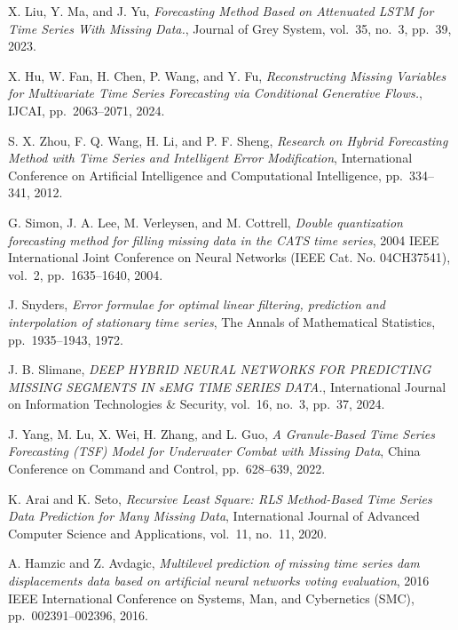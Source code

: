 \begin{enumerate}[label={[S\arabic*]}]
    \item %
    X. Liu, Y. Ma, and J. Yu, \textit{Forecasting Method Based on Attenuated LSTM for Time Series With Missing Data.}, Journal of Grey System, vol.~35, no.~3, pp.~39, 2023.
    \item %
    X. Hu, W. Fan, H. Chen, P. Wang, and Y. Fu, \textit{Reconstructing Missing Variables for Multivariate Time Series Forecasting via Conditional Generative Flows.}, IJCAI, pp.~2063–2071, 2024.
    \item %
    S. X. Zhou, F. Q. Wang, H. Li, and P. F. Sheng, \textit{Research on Hybrid Forecasting Method with Time Series and Intelligent Error Modification}, International Conference on Artificial Intelligence and Computational Intelligence, pp.~334–341, 2012.
    \item %
    G. Simon, J. A. Lee, M. Verleysen, and M. Cottrell, \textit{Double quantization forecasting method for filling missing data in the CATS time series}, 2004 IEEE International Joint Conference on Neural Networks (IEEE Cat. No. 04CH37541), vol.~2, pp.~1635–1640, 2004.
    \item %
    J. Snyders, \textit{Error formulae for optimal linear filtering, prediction and interpolation of stationary time series}, The Annals of Mathematical Statistics, pp.~1935–1943, 1972.
    \item %
    J. B. Slimane, \textit{DEEP HYBRID NEURAL NETWORKS FOR PREDICTING MISSING SEGMENTS IN sEMG TIME SERIES DATA.}, International Journal on Information Technologies \& Security, vol.~16, no.~3, pp.~37, 2024.
    \item %
    J. Yang, M. Lu, X. Wei, H. Zhang, and L. Guo, \textit{A Granule-Based Time Series Forecasting (TSF) Model for Underwater Combat with Missing Data}, China Conference on Command and Control, pp.~628–639, 2022.
    \item %
    K. Arai and K. Seto, \textit{Recursive Least Square: RLS Method-Based Time Series Data Prediction for Many Missing Data}, International Journal of Advanced Computer Science and Applications, vol.~11, no.~11, 2020.
    \item %
    A. Hamzic and Z. Avdagic, \textit{Multilevel prediction of missing time series dam displacements data based on artificial neural networks voting evaluation}, 2016 IEEE International Conference on Systems, Man, and Cybernetics (SMC), pp.~002391–002396, 2016.
    \item %

\end{enumerate}
